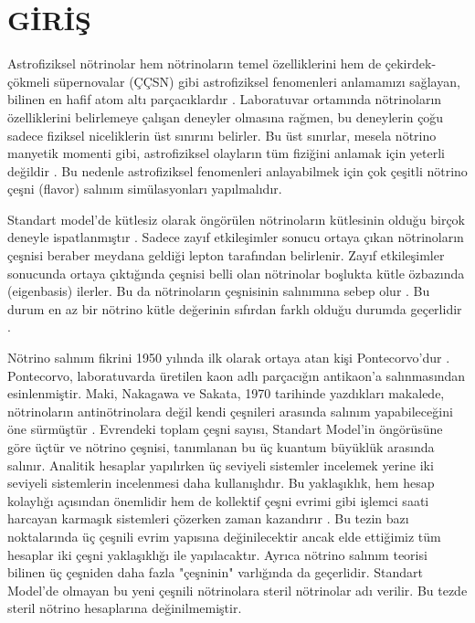 \newpage
\chapter{GİRİŞ}\label{ch:giris}

Astrofiziksel nötrinolar hem nötrinoların temel özelliklerini hem de çekirdek-çökmeli süpernovalar (ÇÇSN) gibi astrofiziksel fenomenleri anlamamızı sağlayan, bilinen en hafif atom altı parçacıklardır \cite{Janka:2006fh, Janka:2012wk, Burrows:2012ew}. Laboratuvar ortamında nötrinoların özelliklerini belirlemeye çalışan deneyler olmasına rağmen, bu deneylerin çoğu sadece fiziksel niceliklerin üst sınırını belirler. Bu üst sınırlar, mesela nötrino manyetik momenti gibi, astrofiziksel olayların tüm fiziğini anlamak için yeterli değildir \cite{Brdar:2020quo, Super-Kamiokande:2020frs}. Bu nedenle astrofiziksel fenomenleri anlayabilmek için çok çeşitli nötrino çeşni (flavor) salınım simülasyonları yapılmalıdır.

Standart model'de kütlesiz olarak öngörülen nötrinoların kütlesinin olduğu birçok deneyle ispatlanmıştır \cite{Gonzalez-Garcia:2007dlo,ParticleDataGroup:2018ovx}. Sadece zayıf etkileşimler sonucu ortaya çıkan nötrinoların çeşnisi beraber meydana geldiği lepton tarafından belirlenir. Zayıf etkileşimler sonucunda ortaya çıktığında çeşnisi belli olan nötrinolar boşlukta kütle özbazında (eigenbasis) ilerler. Bu da nötrinoların çeşnisinin salınımına sebep olur \cite{Super-Kamiokande:1998kpq, Maltoni:2004ei,LSND:2001aii,SNO:2002tuh, T2K:2017hed}. Bu durum en az bir nötrino kütle değerinin sıfırdan farklı olduğu durumda geçerlidir \cite{Giunti:2007ry}.

Nötrino salınım fikrini 1950 yılında ilk olarak ortaya atan kişi Pontecorvo'dur \cite{Pontecorvo:1957cp}. Pontecorvo, laboratuvarda üretilen kaon adlı parçacığın antikaon'a salınmasından esinlenmiştir. Maki, Nakagawa ve Sakata, 1970 tarihinde yazdıkları makalede, nötrinoların antinötrinolara değil kendi çeşnileri arasında salınım yapabileceğini öne sürmüştür \cite{Maki:1962mu}. Evrendeki toplam çeşni sayısı, Standart Model'in öngörüsüne göre üçtür \cite{ParticleDataGroup:2018ovx} ve nötrino çeşnisi, tanımlanan bu üç kuantum büyüklük arasında salınır. Analitik hesaplar yapılırken üç seviyeli sistemler incelemek yerine iki seviyeli sistemlerin incelenmesi daha kullanışlıdır. Bu yaklaşıklık, hem hesap kolaylığı açısından önemlidir hem de kollektif çeşni evrimi gibi işlemci saati harcayan karmaşık sistemleri çözerken zaman kazandırır \cite{Duan:2010bg, Mirizzi:2015eza}. Bu tezin bazı noktalarında üç çeşnili evrim yapısına değinilecektir ancak elde ettiğimiz tüm hesaplar iki çeşni yaklaşıklığı ile yapılacaktır. Ayrıca nötrino salınım teorisi bilinen üç çeşniden daha fazla "çeşninin" varlığında da geçerlidir. Standart Model'de olmayan bu yeni çeşnili nötrinolara steril nötrinolar adı verilir. Bu tezde steril nötrino hesaplarına değinilmemiştir.

